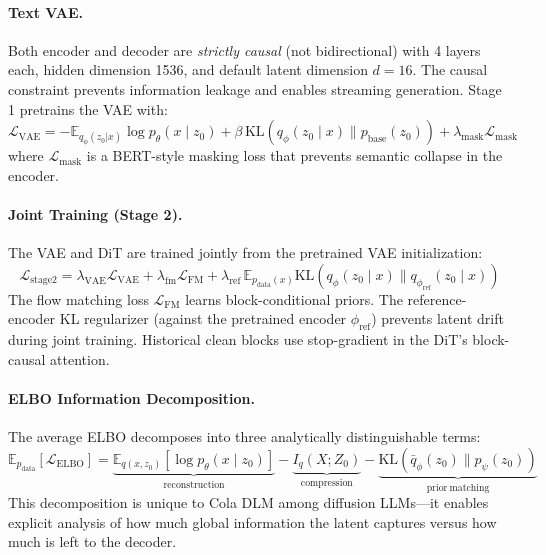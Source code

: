 \documentclass[11pt]{article}
\begin{document}
\paragraph{Text VAE.}
Both encoder and decoder are \emph{strictly causal} (not bidirectional) with 4 layers each, hidden dimension 1536, and default latent dimension $d = 16$. The causal constraint prevents information leakage and enables streaming generation. Stage 1 pretrains the VAE with:
\begin{equation}
    \mathcal{L}_{\mathrm{VAE}} = -\mathbb{E}_{q_\phi(z_0 | x)} \log p_\theta(x \mid z_0) + \beta\, \mathrm{KL}(q_\phi(z_0 \mid x) \| p_{\mathrm{base}}(z_0)) + \lambda_{\mathrm{mask}} \mathcal{L}_{\mathrm{mask}}
\end{equation}
where $\mathcal{L}_{\mathrm{mask}}$ is a BERT-style masking loss that prevents semantic collapse in the encoder.

\paragraph{Joint Training (Stage 2).}
The VAE and DiT are trained jointly from the pretrained VAE initialization:
\begin{equation}
    \mathcal{L}_{\mathrm{stage2}} = \lambda_{\mathrm{VAE}} \mathcal{L}_{\mathrm{VAE}} + \lambda_{\mathrm{fm}} \mathcal{L}_{\mathrm{FM}} + \lambda_{\mathrm{ref}}\, \mathbb{E}_{p_{\mathrm{data}}(x)} \mathrm{KL}(q_\phi(z_0 \mid x) \| q_{\phi_{\mathrm{ref}}}(z_0 \mid x))
\end{equation}
The flow matching loss $\mathcal{L}_{\mathrm{FM}}$ learns block-conditional priors. The reference-encoder KL regularizer (against the pretrained encoder $\phi_{\mathrm{ref}}$) prevents latent drift during joint training. Historical clean blocks use stop-gradient in the DiT's block-causal attention.

\paragraph{ELBO Information Decomposition.}
The average ELBO decomposes into three analytically distinguishable terms:
\begin{equation}
    \mathbb{E}_{p_{\mathrm{data}}} [\mathcal{L}_{\mathrm{ELBO}}] = \underbrace{\mathbb{E}_{q(x,z_0)} [\log p_\theta(x \mid z_0)]}_{\mathrm{reconstruction}} - \underbrace{I_q(X; Z_0)}_{\mathrm{compression}} - \underbrace{\mathrm{KL}(\bar{q}_\phi(z_0) \| p_\psi(z_0))}_{\mathrm{prior\ matching}}
\end{equation}
This decomposition is unique to Cola DLM among diffusion LLMs---it enables explicit analysis of how much global information the latent captures versus how much is left to the decoder.
\end{document}
